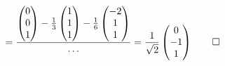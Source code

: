 \begin{loesung}
\begin{align*}
&=
\frac{
\begin{pmatrix}0\\0\\1\end{pmatrix}
-\frac13\begin{pmatrix}1\\1\\1\end{pmatrix}
-\frac16\begin{pmatrix}-2\\1\\1\end{pmatrix}}{\dots}
=
\frac1{\sqrt{2}}\begin{pmatrix}0\\-1\\1\end{pmatrix}
\qedhere
\end{align*}
\end{loesung}


